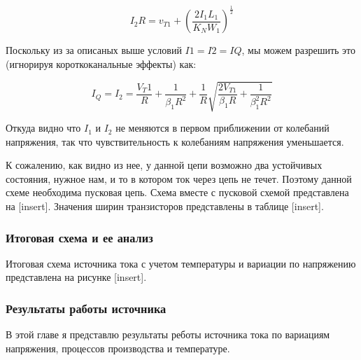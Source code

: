 \documentclass[a4paper,12pt]{article} %
\begin{document}
 $$ I_2 R = v_{T1} + ( \frac{2I_1 L_1}{ K_N W_1})^{\frac{1}{2}} $$

 Поскольку из за описаных выше условий $ I1=I2=IQ $, мы можем разрешить это (игнорируя короткоканальные эффекты) как:

\begin{equation}
    I_Q = I_2 =  \frac{V_T1}{R} + \frac{1}{\beta_1 R^2} + \frac{1}{R} \sqrt{ \frac{2 V_{T1}}{\beta_1 R} + \frac{1}{\beta_1^2 R^2}}
\end{equation}

Откуда видно что $I_1$ и $I_2$ не меняются в первом приближении от колебаний напряжения, так что чувствительность к колебаниям напряжения уменьшается. 


К сожалению, как видно из нее, у данной цепи возможно два устойчивых состояния, нужное нам, и то в котором ток через цепь не течет. Поэтому данной схеме необходима пусковая цепь. Схема вместе с пусковой схемой представлена на  [insert]. Значения ширин транзисторов представлены в таблице [insert]. 

\subsubsection{Итоговая схема и ее анализ}

Итоговая схема источника тока с учетом температуры и вариации по напряжению представлена на рисунке [insert]. 







\subsubsection{Результаты работы источника}


В этой главе я представлю результаты реботы источника тока по вариациям напряжения, процессов производства и температуре.
\end{document}
